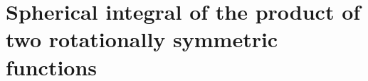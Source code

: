 \documentclass[11pt]{article}
\providecommand{\sd}{\mathbf{\hat{s}}_d}
\providecommand{\pp}{\mathbf{\hat{p}}}
\providecommand{\mh}[1]{\mathbf{\hat{#1}}}
\let\originalleft\left
\let\originalright\right
\renewcommand{\left}{\mathopen{}\mathclose\bgroup\originalleft}
\renewcommand{\right}{\aftergroup\egroup\originalright}
\begin{document}



\appendix
\section{Spherical integral of the product of two rotationally symmetric
  functions} \label{sec:spherical}
\end{document}
